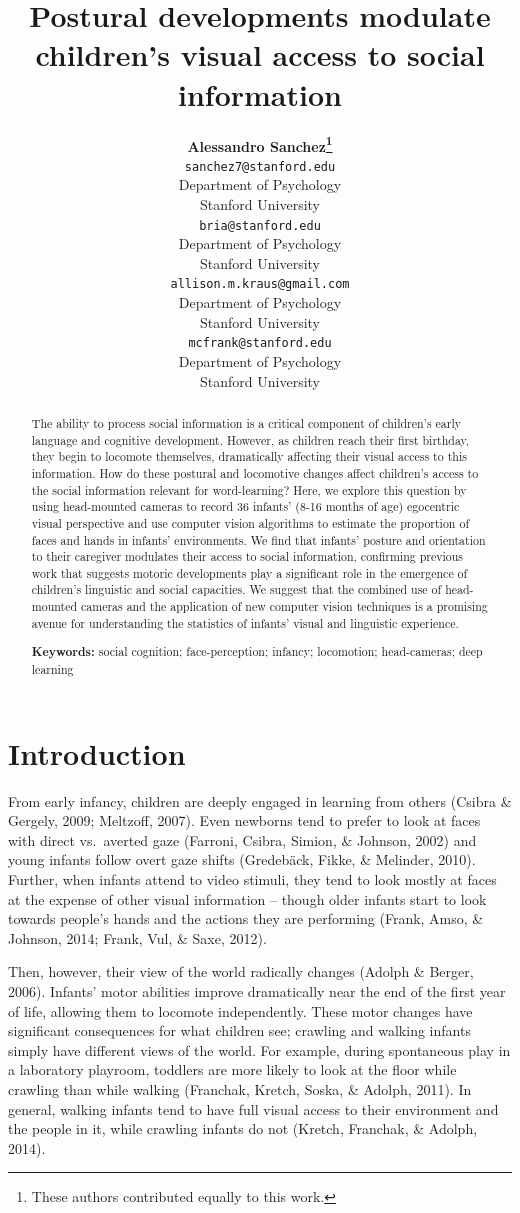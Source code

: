 \documentclass[10pt, letterpaper]{article}
\title{Postural developments modulate children's visual access to social
information}
\author{{\large \bf Alessandro Sanchez\thanks{These authors contributed equally to this work.}} \\ \texttt{sanchez7@stanford.edu} \\ Department of Psychology \\ Stanford University \And {\large \bf Bria Long\footnotemark[1]}  \\ \texttt{bria@stanford.edu} \\ Department of Psychology \\ Stanford University \And {\large \bf Allison M. Kraus} \\ \texttt{allison.m.kraus@gmail.com} \\ Department of Psychology \\ Stanford University \And {\large \bf Michael C. Frank} \\ \texttt{mcfrank@stanford.edu} \\ Department of Psychology \\ Stanford University}
\begin{document}
\maketitle

\begin{abstract}
The ability to process social information is a critical component of
children's early language and cognitive development. However, as
children reach their first birthday, they begin to locomote themselves,
dramatically affecting their visual access to this information. How do
these postural and locomotive changes affect children's access to the
social information relevant for word-learning? Here, we explore this
question by using head-mounted cameras to record 36 infants' (8-16
months of age) egocentric visual perspective and use computer vision
algorithms to estimate the proportion of faces and hands in infants'
environments. We find that infants' posture and orientation to their
caregiver modulates their access to social information, confirming
previous work that suggests motoric developments play a significant role
in the emergence of children's linguistic and social capacities. We
suggest that the combined use of head-mounted cameras and the
application of new computer vision techniques is a promising avenue for
understanding the statistics of infants' visual and linguistic
experience.

\textbf{Keywords:}
social cognition; face-perception; infancy; locomotion; head-cameras;
deep learning
\end{abstract}

\section{Introduction}\label{introduction}

From early infancy, children are deeply engaged in learning from others
(Csibra \& Gergely, 2009; Meltzoff, 2007). Even newborns tend to prefer
to look at faces with direct vs.~averted gaze (Farroni, Csibra, Simion,
\& Johnson, 2002) and young infants follow overt gaze shifts (Gredebäck,
Fikke, \& Melinder, 2010). Further, when infants attend to video
stimuli, they tend to look mostly at faces at the expense of other
visual information -- though older infants start to look towards
people's hands and the actions they are performing (Frank, Amso, \&
Johnson, 2014; Frank, Vul, \& Saxe, 2012).

Then, however, their view of the world radically changes (Adolph \&
Berger, 2006). Infants' motor abilities improve dramatically near the
end of the first year of life, allowing them to locomote independently.
These motor changes have significant consequences for what children see;
crawling and walking infants simply have different views of the world.
For example, during spontaneous play in a laboratory playroom, toddlers
are more likely to look at the floor while crawling than while walking
(Franchak, Kretch, Soska, \& Adolph, 2011). In general, walking infants
tend to have full visual access to their environment and the people in
it, while crawling infants do not (Kretch, Franchak, \& Adolph, 2014).
\end{document}
